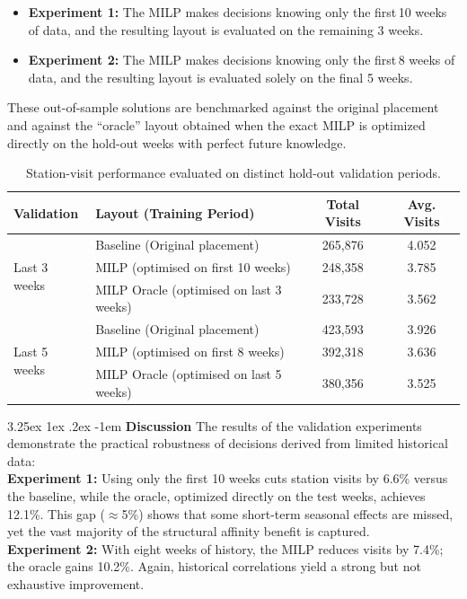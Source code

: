 \documentclass[preprint,review,11pt,authoryear]{elsarticle}
\makeatletter
\renewcommand\paragraph{\@startsection{paragraph}{4}{\z@}
  {3.25ex \@plus1ex \@minus.2ex}
  {-1em}
  {\normalfont\normalsize\itshape}}
\makeatother
\begin{document}
\begin{itemize}
  \item \textbf{Experiment 1:} The MILP makes decisions knowing only the first\,10 weeks of data, and the resulting layout is evaluated on the remaining 3 weeks.  
  \item \textbf{Experiment 2:} The MILP makes decisions knowing only the first\,8 weeks of data, and the resulting layout is evaluated solely on the final 5 weeks.
\end{itemize}

These out-of-sample solutions are benchmarked against the original placement and against the “oracle” layout obtained when the exact MILP is optimized directly on the hold-out weeks with perfect future knowledge.

\begin{table}[H]
\centering
\small
\renewcommand{\arraystretch}{1.1}
\setlength{\tabcolsep}{6pt}
\begin{tabular}{@{}llcc@{}}
\toprule
\textbf{Validation} & \textbf{Layout (Training Period)} & \textbf{Total Visits} & \textbf{Avg. Visits} \\
\midrule
\multirow{3}{*}{Last 3 weeks} & Baseline (Original placement) & 265,876 & 4.052 \\
& MILP (optimised on first 10 weeks) & 248,358 & 3.785 \\
& MILP Oracle (optimised on last 3 weeks) & 233,728 & 3.562 \\
\midrule
\multirow{3}{*}{Last 5 weeks} & Baseline (Original placement) & 423,593 & 3.926 \\
& MILP (optimised on first 8 weeks) & 392,318 & 3.636 \\
& MILP Oracle (optimised on last 5 weeks) & 380,356 & 3.525 \\
\bottomrule
\end{tabular}
\caption{Station-visit performance evaluated on distinct hold-out validation periods.}
\label{tab:temporal_validation}
\end{table}

\paragraph{\textbf{Discussion}}
The results of the validation experiments demonstrate the practical robustness of decisions derived from limited historical data: \\
\textbf{Experiment 1:} Using only the first 10 weeks cuts station visits by 6.6\% versus the baseline, while the oracle, optimized directly on the test weeks, achieves 12.1\%. This gap ($\approx$5\%) shows that some short-term seasonal effects are missed, yet the vast majority of the structural affinity benefit is captured. \\
\textbf{Experiment 2:} With eight weeks of history, the MILP reduces visits by 7.4\%; the oracle gains 10.2\%. Again, historical correlations yield a strong but not exhaustive improvement. 
\end{document}
